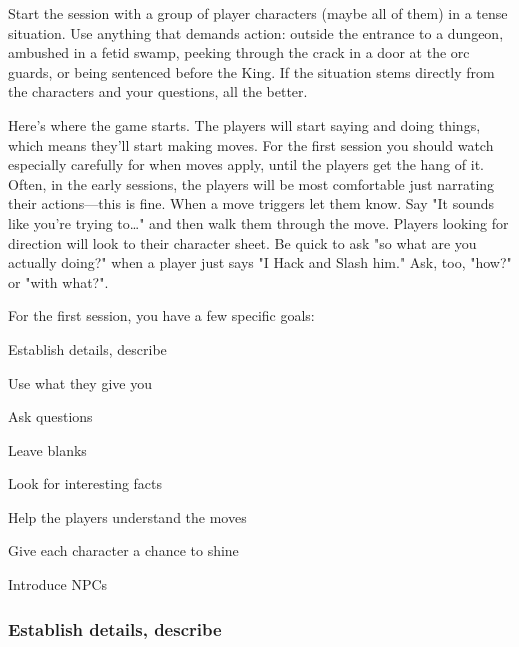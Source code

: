 Start the session with a group of player characters (maybe all of them) in a tense situation. Use anything that demands action: outside the entrance to a dungeon, ambushed in a fetid swamp, peeking through the crack in a door at the orc guards, or being sentenced before the King. If the situation stems directly from the characters and your questions, all the better.

       

Here's where the game starts. The players will start saying and doing things, which means they'll start making moves. For the first session you should watch especially carefully for when moves apply, until the players get the hang of it. Often, in the early sessions, the players will be most comfortable just narrating their actions—this is fine. When a move triggers let them know. Say "It sounds like you're trying to…" and then walk them through the move. Players looking for direction will look to their character sheet. Be quick to ask "so what are you actually doing?" when a player just says "I Hack and Slash him." Ask, too, "how?" or "with what?".

       

For the first session, you have a few specific goals:

       
\startitemize[1,packed]
         
\item Establish details, describe

         
\item Use what they give you

         
\item Ask questions

         
\item Leave blanks

         
\item Look for interesting facts

         
\item Help the players understand the moves

         
\item Give each character a chance to shine

         
\item Introduce NPCs

       
\stopitemize
       
\subsubsection{Establish details, describe}     
       

